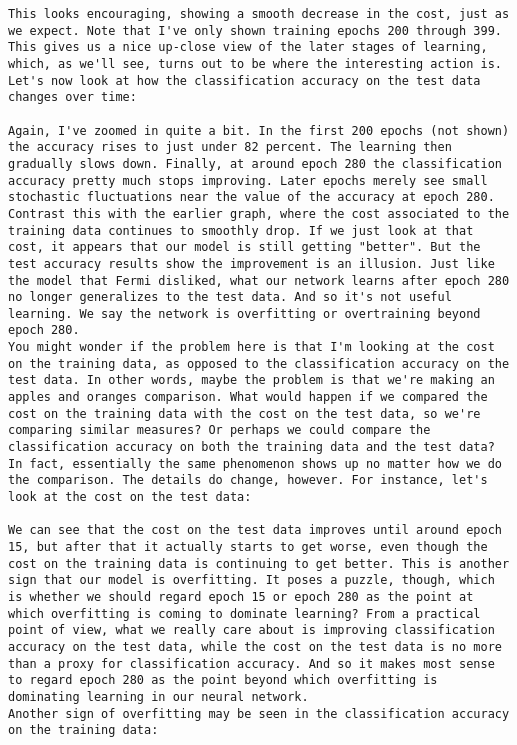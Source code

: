 \begin{lstlisting}
This looks encouraging, showing a smooth decrease in the cost, just as we expect. Note that I've only shown training epochs 200 through 399. This gives us a nice up-close view of the later stages of learning, which, as we'll see, turns out to be where the interesting action is.
Let's now look at how the classification accuracy on the test data changes over time:

Again, I've zoomed in quite a bit. In the first 200 epochs (not shown) the accuracy rises to just under 82 percent. The learning then gradually slows down. Finally, at around epoch 280 the classification accuracy pretty much stops improving. Later epochs merely see small stochastic fluctuations near the value of the accuracy at epoch 280. Contrast this with the earlier graph, where the cost associated to the training data continues to smoothly drop. If we just look at that cost, it appears that our model is still getting "better". But the test accuracy results show the improvement is an illusion. Just like the model that Fermi disliked, what our network learns after epoch 280 no longer generalizes to the test data. And so it's not useful learning. We say the network is overfitting or overtraining beyond epoch 280.
You might wonder if the problem here is that I'm looking at the cost on the training data, as opposed to the classification accuracy on the test data. In other words, maybe the problem is that we're making an apples and oranges comparison. What would happen if we compared the cost on the training data with the cost on the test data, so we're comparing similar measures? Or perhaps we could compare the classification accuracy on both the training data and the test data? In fact, essentially the same phenomenon shows up no matter how we do the comparison. The details do change, however. For instance, let's look at the cost on the test data:

We can see that the cost on the test data improves until around epoch 15, but after that it actually starts to get worse, even though the cost on the training data is continuing to get better. This is another sign that our model is overfitting. It poses a puzzle, though, which is whether we should regard epoch 15 or epoch 280 as the point at which overfitting is coming to dominate learning? From a practical point of view, what we really care about is improving classification accuracy on the test data, while the cost on the test data is no more than a proxy for classification accuracy. And so it makes most sense to regard epoch 280 as the point beyond which overfitting is dominating learning in our neural network.
Another sign of overfitting may be seen in the classification accuracy on the training data:


\end{lstlisting}
